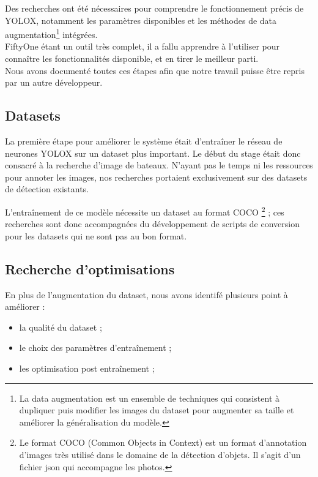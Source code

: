 Des recherches ont été nécessaires pour comprendre le fonctionnement précis de YOLOX,
notamment les paramètres disponibles et les méthodes de data augmentation\footnote{La
data augmentation est un ensemble de techniques qui consistent à dupliquer puis modifier les images
du dataset pour augmenter sa taille et améliorer la généralisation du modèle.} intégrées. \\

FiftyOne étant un outil très complet, il a fallu apprendre à l'utiliser pour connaître
les fonctionnalités disponible, et en tirer le meilleur parti. \\


Nous avons documenté toutes ces étapes afin que notre travail puisse être repris par un autre
développeur.\\

\subsection{Datasets}

La première étape pour améliorer le système était d'entraîner le réseau de neurones YOLOX
sur un dataset plus important. Le début du stage était donc consacré à la recherche
d'image de bateaux. N'ayant pas le temps ni les ressources pour annoter les images,
nos recherches portaient exclusivement sur des datasets de détection existants.

L'entraînement de ce modèle nécessite un dataset au format COCO
\footnote{Le format COCO (Common Objects in Context) est un format d'annotation
d'images très utilisé dans le domaine de la détection d'objets. Il s'agit d'un fichier
json qui accompagne les photos.} ; ces recherches sont donc accompagnées du développement
de scripts de conversion pour les datasets qui ne sont pas au bon format.\\

\subsection{Recherche d'optimisations}

En plus de l'augmentation du dataset, nous avons identifé plusieurs point à améliorer :

\begin{itemize}
    \item la qualité du dataset ;
    \item le choix des paramètres d'entraînement ;
    \item les optimisation post entraînement ;
\end{itemize}

